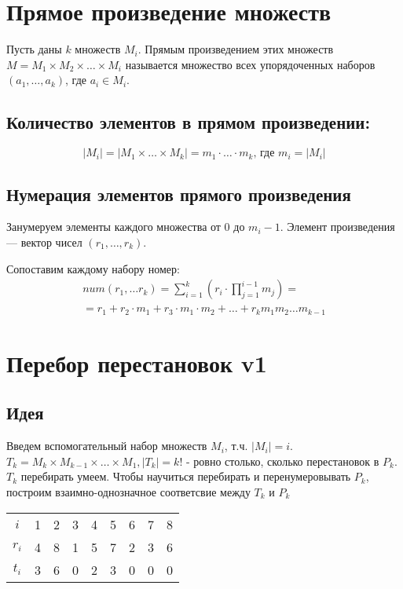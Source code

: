 \documentclass[main]{subfiles}
\begin{document}
\section{Прямое произведение множеств}
\begin{definition}
    Пусть даны $k$ множеств $M_i$. Прямым произведением этих множеств 
    $M = M_1 \times M_2 \times \ldots \times M_i$ называется множество всех 
    упорядоченных наборов $(a_1, \ldots, a_k)$, где $a_i \in M_i$.
\end{definition}
\subsection{Количество элементов в прямом произведении:}
\[
    |M_i| = |M_1 \times \ldots \times M_k| = m_1 \cdot \ldots \cdot m_k 
    \text{, где $m_i=|M_i|$}
\]

\subsection{Нумерация элементов прямого произведения}
Занумеруем элементы каждого множества от 0 до $m_i - 1$. Элемент произведения ---
вектор чисел $(r_1, \ldots, r_k)$.

Сопоставим каждому набору номер:
\begin{multline}
    num(r_1, \ldots r_k) = \sum_{i = 1}^{k}\left(r_i \cdot \prod\limits_{j=1}^{i-1}m_j\right) = \\
    = r_1 + r_2 \cdot m_1 + r_3 \cdot m_1 \cdot m_2 + \ldots + r_k m_1 m_2 \ldots m_{k-1}
\end{multline}

\section{Перебор перестановок v1}
\subsection{Идея}
Введем вспомогательный набор множеств $M_i$, т.ч. $|M_i| = i$.
$T_k = M_k \times M_{k-1} \times \ldots \times M_1, |T_k| = k!$ - 
ровно столько, сколько перестановок в $P_k$. $T_k$ перебирать умеем. 
Чтобы научиться перебирать и перенумеровывать $P_k$, построим
взаимно-однозначное соответсвие между $T_k$ и $P_k$

\begin{center}
    \begin{tabular}[c]{*{8}{c|}c}
        $i$   & 1 & 2 & 3 & 4 & 5 & 6 & 7 & 8 \\ \cline{1-9}
        $r_i$ & 4 & 8 & 1 & 5 & 7 & 2 & 3 & 6 \\ \cline{1-9}
        $t_i$ & 3 & 6 & 0 & 2 & 3 & 0 & 0 & 0 
    \end{tabular}
\end{center}
\end{document}
